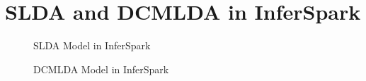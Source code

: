 \section{SLDA and DCMLDA in InferSpark}\label{models}

\begin{figure}[h]
	
	\caption{SLDA Model in InferSpark}
\end{figure}

\begin{figure}[h]
	
	\caption{DCMLDA Model in InferSpark}
\end{figure}


